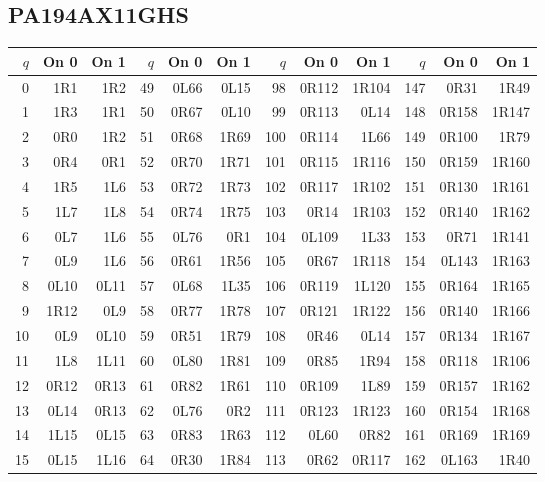\subsection{PA194AX11GHS}
\begingroup\scriptsize
\setlength{\tabcolsep}{5pt}
\renewcommand{\arraystretch}{1.07}
\begin{center}
\begin{tabular}{rrr@{\hspace{7mm}}rrr@{\hspace{7mm}}rrr@{\hspace{7mm}}rrr}
\toprule
$q$ & On 0 & On 1 & $q$ & On 0 & On 1 & $q$ & On 0 & On 1 & $q$ & On 0 & On 1 \\
\midrule
0 & 1R1 & 1R2 & 49 & 0L66 & 0L15 & 98 & 0R112 & 1R104 & 147 & 0R31 & 1R49 \\
1 & 1R3 & 1R1 & 50 & 0R67 & 0L10 & 99 & 0R113 & 0L14 & 148 & 0R158 & 1R147 \\
2 & 0R0 & 1R2 & 51 & 0R68 & 1R69 & 100 & 0R114 & 1L66 & 149 & 0R100 & 1R79 \\
3 & 0R4 & 0R1 & 52 & 0R70 & 1R71 & 101 & 0R115 & 1R116 & 150 & 0R159 & 1R160 \\
4 & 1R5 & 1L6 & 53 & 0R72 & 1R73 & 102 & 0R117 & 1R102 & 151 & 0R130 & 1R161 \\
5 & 1L7 & 1L8 & 54 & 0R74 & 1R75 & 103 & 0R14 & 1R103 & 152 & 0R140 & 1R162 \\
6 & 0L7 & 1L6 & 55 & 0L76 & 0R1 & 104 & 0L109 & 1L33 & 153 & 0R71 & 1R141 \\
7 & 0L9 & 1L6 & 56 & 0R61 & 1R56 & 105 & 0R67 & 1R118 & 154 & 0L143 & 1R163 \\
8 & 0L10 & 0L11 & 57 & 0L68 & 1L35 & 106 & 0R119 & 1L120 & 155 & 0R164 & 1R165 \\
9 & 1R12 & 0L9 & 58 & 0R77 & 1R78 & 107 & 0R121 & 1R122 & 156 & 0R140 & 1R166 \\
10 & 0L9 & 0L10 & 59 & 0R51 & 1R79 & 108 & 0R46 & 0L14 & 157 & 0R134 & 1R167 \\
11 & 1L8 & 1L11 & 60 & 0L80 & 1R81 & 109 & 0R85 & 1R94 & 158 & 0R118 & 1R106 \\
12 & 0R12 & 0R13 & 61 & 0R82 & 1R61 & 110 & 0R109 & 1L89 & 159 & 0R157 & 1R162 \\
13 & 0L14 & 0R13 & 62 & 0L76 & 0R2 & 111 & 0R123 & 1R123 & 160 & 0R154 & 1R168 \\
14 & 1L15 & 0L15 & 63 & 0R83 & 1R63 & 112 & 0L60 & 0R82 & 161 & 0R169 & 1R169 \\
15 & 0L15 & 1L16 & 64 & 0R30 & 1R84 & 113 & 0R62 & 0R117 & 162 & 0L163 & 1R40 \\

\end{tabular}
\end{center}
